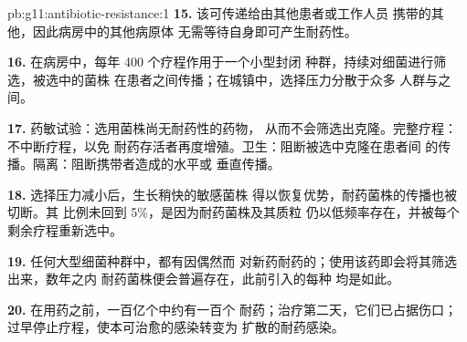 \begin{solution}{pb:g11:antibiotic-resistance:1}
\textbf{15.} 该可传递给由其他患者或工作人员
携带的其他，因此病房中的其他病原体
无需等待自身即可产生耐药性。

\textbf{16.} 在病房中，每年 400 个疗程作用于一个小型封闭
种群，持续对细菌进行筛选，被选中的菌株
在患者之间传播；在城镇中，选择压力分散于众多
人群与之间。

\textbf{17.} 药敏试验：选用菌株尚无耐药性的药物，
从而不会筛选出克隆。完整疗程：不中断疗程，以免
耐药存活者再度增殖。卫生：阻断被选中克隆在患者间
的传播。隔离：阻断携带者造成的水平或
垂直传播。

\textbf{18.} 选择压力减小后，生长稍快的敏感菌株
得以恢复优势，耐药菌株的传播也被切断。其
比例未回到 5\%，是因为耐药菌株及其质粒
仍以低频率存在，并被每个
剩余疗程重新选中。

\textbf{19.} 任何大型细菌种群中，都有因偶然而
对新药耐药的；使用该药即会将其筛选出来，数年之内
耐药菌株便会普遍存在，此前引入的每种
均是如此。

\textbf{20.} 在用药之前，一百亿个中约有一百个
耐药；治疗第二天，它们已占据伤口；
过早停止疗程，使本可治愈的感染转变为
扩散的耐药感染。
\end{solution}
